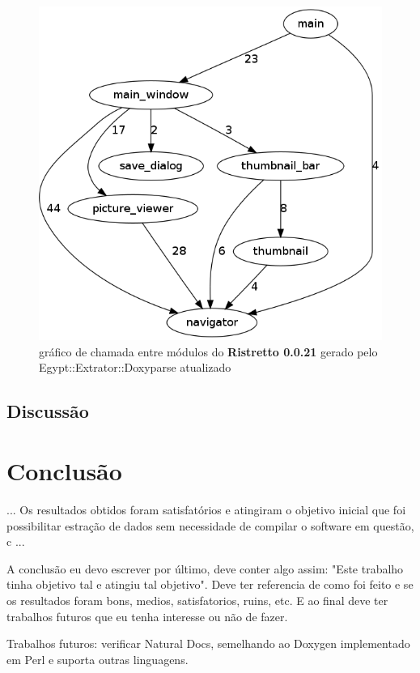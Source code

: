 \begin{figure}
\center
\includegraphics[scale=0.5]{imagens/ristretto-0_0_21-doxyparse-2}
\caption{gráfico de chamada entre módulos do {\bf Ristretto 0.0.21} gerado pelo Egypt::Extrator::Doxyparse atualizado}
\label{ristretto-0.0.21-doxyparse-2}
\end{figure}

\section{Discussão}

\chapter{Conclusão}

... Os resultados obtidos foram satisfatórios e atingiram o objetivo inicial que
foi possibilitar estração de dados sem necessidade de compilar o software em
questão, c ...

A conclusão eu devo escrever por último, deve conter algo assim: "Este trabalho
tinha objetivo tal e atingiu tal objetivo". Deve ter referencia de como foi
feito e se os resultados foram bons, medios, satisfatorios, ruins, etc. E ao
final deve ter trabalhos futuros que eu tenha interesse ou não de fazer.

Trabalhos futuros: verificar Natural Docs, semelhando ao Doxygen implementado
em Perl e suporta outras linguagens.
